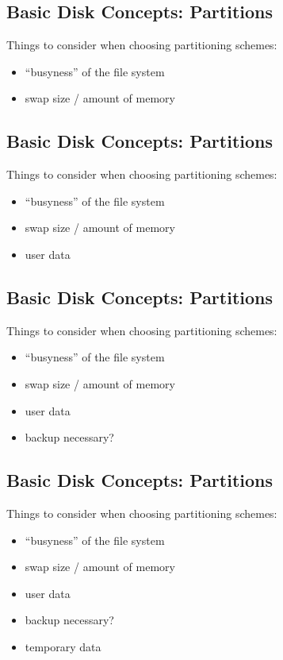 \documentclass[xga]{xdvislides}
\begin{document}
\subsection{Basic Disk Concepts: Partitions}
Things to consider when choosing partitioning schemes:
\begin{itemize}
	\item ``busyness'' of the file system
	\item swap size / amount of memory
\end{itemize}

\subsection{Basic Disk Concepts: Partitions}
Things to consider when choosing partitioning schemes:
\begin{itemize}
	\item ``busyness'' of the file system
	\item swap size / amount of memory
	\item user data
\end{itemize}

\subsection{Basic Disk Concepts: Partitions}
Things to consider when choosing partitioning schemes:
\begin{itemize}
	\item ``busyness'' of the file system
	\item swap size / amount of memory
	\item user data
	\item backup necessary?
\end{itemize}

\subsection{Basic Disk Concepts: Partitions}
Things to consider when choosing partitioning schemes:
\begin{itemize}
	\item ``busyness'' of the file system
	\item swap size / amount of memory
	\item user data
	\item backup necessary?
	\item temporary data
\end{itemize}
\end{document}
